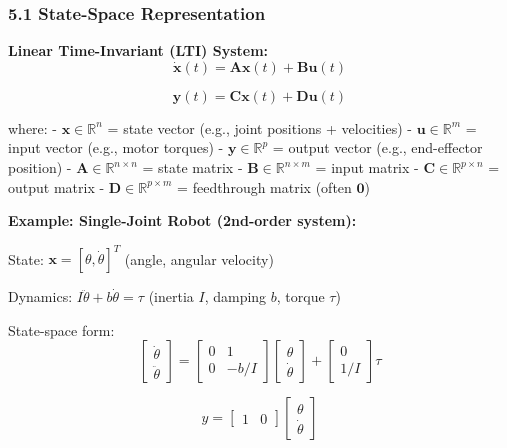 \documentclass[
]{article}
\begin{document}
\hypertarget{state-space-representation}{%
\subsubsection{5.1 State-Space
Representation}\label{state-space-representation}}

\textbf{Linear Time-Invariant (LTI) System:} \[
\dot{\mathbf{x}}(t) = \mathbf{A} \mathbf{x}(t) + \mathbf{B} \mathbf{u}(t)
\]

\[
\mathbf{y}(t) = \mathbf{C} \mathbf{x}(t) + \mathbf{D} \mathbf{u}(t)
\]

where: - \(\mathbf{x} \in \mathbb{R}^n\) = state vector (e.g., joint
positions + velocities) - \(\mathbf{u} \in \mathbb{R}^m\) = input vector
(e.g., motor torques) - \(\mathbf{y} \in \mathbb{R}^p\) = output vector
(e.g., end-effector position) -
\(\mathbf{A} \in \mathbb{R}^{n \times n}\) = state matrix -
\(\mathbf{B} \in \mathbb{R}^{n \times m}\) = input matrix -
\(\mathbf{C} \in \mathbb{R}^{p \times n}\) = output matrix -
\(\mathbf{D} \in \mathbb{R}^{p \times m}\) = feedthrough matrix (often
\(\mathbf{0}\))

\textbf{Example: Single-Joint Robot (2nd-order system):}

State: \(\mathbf{x} = [\theta, \dot{\theta}]^T\) (angle, angular
velocity)

Dynamics: \(I \ddot{\theta} + b \dot{\theta} = \tau\) (inertia \(I\),
damping \(b\), torque \(\tau\))

State-space form: \[
\begin{bmatrix} \dot{\theta} \\ \ddot{\theta} \end{bmatrix}
=
\begin{bmatrix} 0 & 1 \\ 0 & -b/I \end{bmatrix}
\begin{bmatrix} \theta \\ \dot{\theta} \end{bmatrix}
+
\begin{bmatrix} 0 \\ 1/I \end{bmatrix} \tau
\]

\[
y = \begin{bmatrix} 1 & 0 \end{bmatrix} \begin{bmatrix} \theta \\ \dot{\theta} \end{bmatrix}
\]
\end{document}
